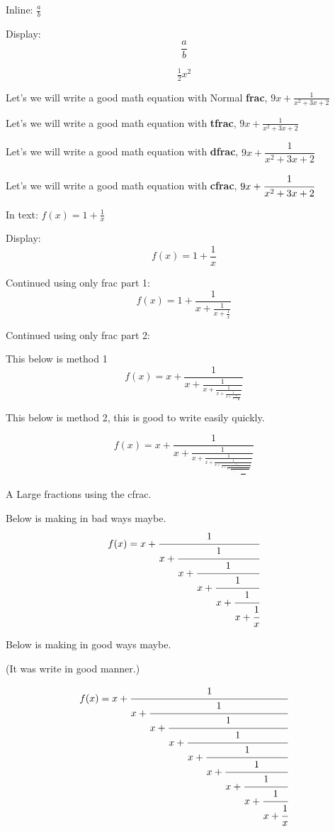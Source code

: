 \documentclass[12pt, letterpaper]{article}
\begin{document}
\newpage

Inline: $\frac{a}{b}$

Display:
\[
\frac{a}{b}
\]


\[
\tfrac{1}{2}x^2
\]

Let's we will write a good math equation with Normal \textbf{frac}, $9x + \frac{1}{x^2+3x + 2}$

Let's we will write a good math equation with \textbf{tfrac}, $9x + \tfrac{1}{x^2+3x + 2}$

Let's we will write a good math equation with \textbf{dfrac}, $9x + \dfrac{1}{x^2+3x + 2}$

Let's we will write a good math equation with \textbf{cfrac}, $9x + \cfrac{1}{x^2+3x + 2}$




In text: \( f(x) = 1 + \tfrac{1}{x} \)

Display:
\[
f(x) = 1 + \dfrac{1}{x}
\]



Continued using only frac part 1:
\[
f(x) = 1 + \frac{1}{x + \frac{1}{x + \frac{1}{x}}}
\]


Continued using only frac part 2:

This below is method  1
\[
    f(x) = x + \frac{1}{x + \frac{1}{x + \frac{1}{x + \frac{1}{x + \frac{1}{x + \frac{1}{x}}}}}}
    \]
    

This below is method  2, this is good to write easily quickly.

\[
f(x) = x + \frac{1}{x + 
         \frac{1}{x + 
         \frac{1}{x + 
         \frac{1}{x + 
         \frac{1}{x + 
         \frac{1}{x + 
         \frac{1}{x + 
         \frac{1}{x + 
         \frac{1}{x + 
         \frac{1}{x + 
         \frac{1}{x + 
         \frac{1}{x + 
         \frac{1}{x + 
         \frac{1}{x + 
         \frac{1}{x
         }}}}}}}}}}}}}}}
\]





\newpage

A Large fractions using the cfrac.

Below is making in bad ways maybe.
\[
    f(x) = x + \cfrac{1}{x + \cfrac{1}{x + \cfrac{1}{x + \cfrac{1}{x + \cfrac{1}{x + \cfrac{1}{x}}}}}}
\]
    
Below is making in good ways maybe.

(It was write in good manner.)

\[
f(x) = x + \cfrac{1}{x + 
          \cfrac{1}{x + 
          \cfrac{1}{x + 
          \cfrac{1}{x + 
          \cfrac{1}{x + 
          \cfrac{1}{x + 
          \cfrac{1}{x + 
          \cfrac{1}{x + 
          \cfrac{1}{x
          }}}}}}}}}
\]
\end{document}

